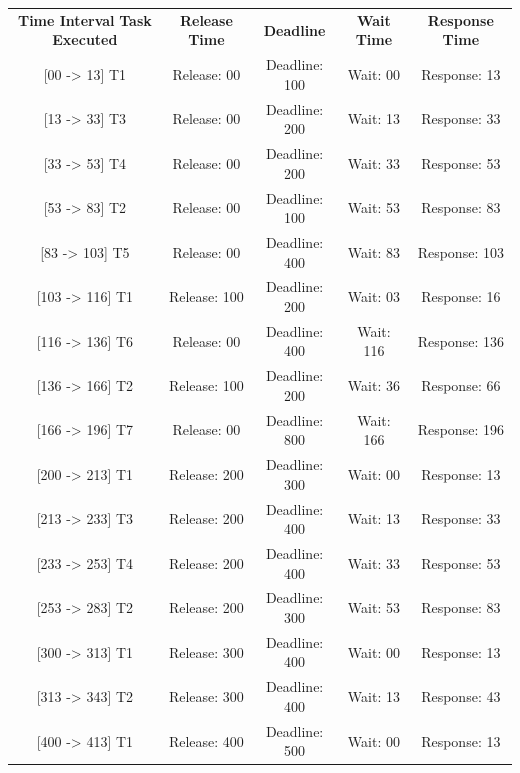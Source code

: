 \documentclass{report}
\begin{document}
\begin{table}[ht]
    \centering
    \begin{tabular}{| c | c | c | c | c |}
        \hline
         \textbf{Time Interval} \textbf{Task Executed} & \textbf{Release Time} & \textbf{Deadline} & \textbf{Wait Time} & \textbf{Response Time} \\
        {[00 -> 13]} T1 & Release: 00 & Deadline: 100 & Wait: 00 & Response: 13 \\
        \hline
        {[13 -> 33]} T3 & Release: 00 & Deadline: 200 & Wait: 13 & Response: 33 \\
        \hline
        {[33 -> 53]} T4 & Release: 00 & Deadline: 200 & Wait: 33 & Response: 53 \\
        \hline
        {[53 -> 83]} T2 & Release: 00 & Deadline: 100 & Wait: 53 & Response: 83 \\
        \hline
        {[83 -> 103]} T5 & Release: 00 & Deadline: 400 & Wait: 83 & Response: 103 \\
        \hline
        {[103 -> 116]} T1 & Release: 100 & Deadline: 200 & Wait: 03 & Response: 16 \\
        \hline
        {[116 -> 136]} T6 & Release: 00 & Deadline: 400 & Wait: 116 & Response: 136 \\
        \hline
        {[136 -> 166]} T2 & Release: 100 & Deadline: 200 & Wait: 36 & Response: 66 \\
        \hline
        {[166 -> 196]} T7 & Release: 00 & Deadline: 800 & Wait: 166 & Response: 196 \\
        \hline
        {[200 -> 213]} T1 & Release: 200 & Deadline: 300 & Wait: 00 & Response: 13 \\
        \hline
        {[213 -> 233]} T3 & Release: 200 & Deadline: 400 & Wait: 13 & Response: 33 \\
        \hline
        {[233 -> 253]} T4 & Release: 200 & Deadline: 400 & Wait: 33 & Response: 53 \\
        \hline
        {[253 -> 283]} T2 & Release: 200 & Deadline: 300 & Wait: 53 & Response: 83 \\
        \hline
        {[300 -> 313]} T1 & Release: 300 & Deadline: 400 & Wait: 00 & Response: 13 \\
        \hline
        {[313 -> 343]} T2 & Release: 300 & Deadline: 400 & Wait: 13 & Response: 43 \\
        \hline
        {[400 -> 413]} T1 & Release: 400 & Deadline: 500 & Wait: 00 & Response: 13 \\
        \hline

\end{tabular}
\end{table}
\end{document}
